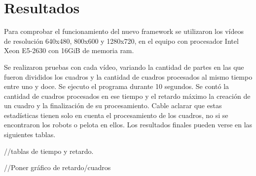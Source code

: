 
\section{Resultados}

Para comprobar el funcionamiento del nuevo framework se utilizaron los vídeos de
resolución 640x480, 800x600 y 1280x720, en el equipo con procesador Intel Xeon
E5-2630 con 16GiB de memoria ram.

Se realizaron pruebas con cada vídeo, variando la cantidad de partes en las que
fueron divididos los cuadros y la cantidad de cuadros procesados al mismo tiempo
entre uno y doce. Se ejecuto el programa durante 10 segundos. Se contó la
cantidad de cuadros procesados en ese tiempo y el retardo máximo la creación de
un cuadro y la finalización de su procesamiento. Cable aclarar que estas
estadísticas tienen solo en cuenta el procesamiento de los cuadros, no si se
encontraron los robots o pelota en ellos. Los resultados finales pueden verse
en las siguientes tablas.

//tablas de tiempo y retardo.

//Poner gráfico de retardo/cuadros
